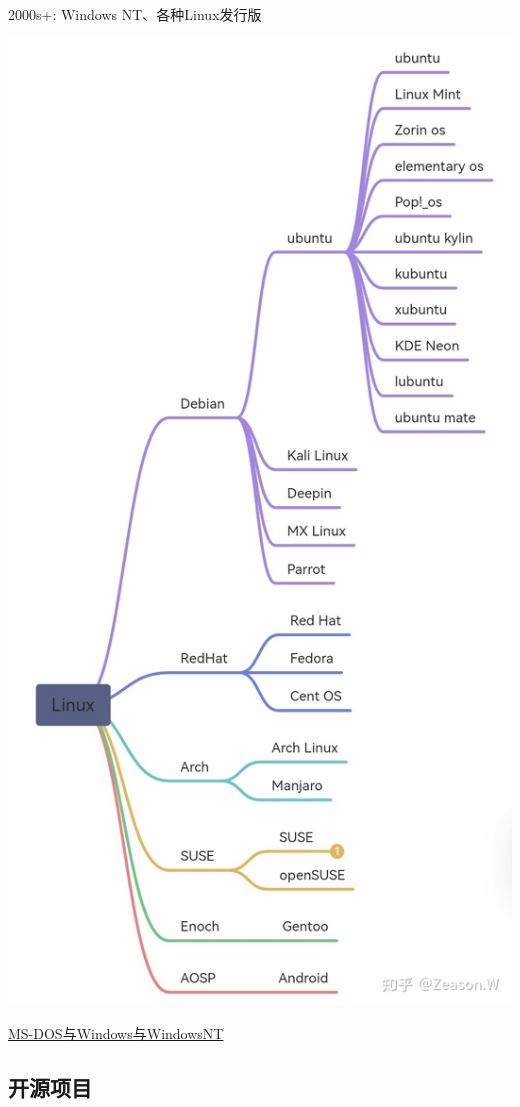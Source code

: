 \documentclass[aspectratio=1610]{beamer}
\begin{document}
\begin{frame}[t]{2000s+: Windows NT、各种Linux发行版}
    \begin{minipage}{0.6\linewidth}
        \centering
        \includegraphics[width=0.45\linewidth]{pic/linux_branch.jpg}
    \end{minipage}
    \begin{minipage}{0.3\linewidth}
        \begin{center}
            \href{https://zhuanlan.zhihu.com/p/549547091}{MS-DOS与Windows与WindowsNT}
        \end{center}
    \end{minipage}
\end{frame}

\subsection{开源项目}
\end{document}
